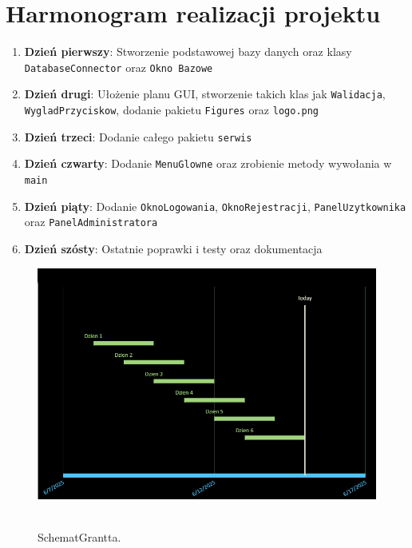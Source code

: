 \chapter{Harmonogram realizacji projektu}
\label{chap:Harmonogram realizacji projektu}

\begin{enumerate}
    \item \textbf{Dzień pierwszy}: Stworzenie podstawowej bazy danych oraz klasy \texttt{DatabaseConnector} oraz \texttt{Okno Bazowe}
    
    \item \textbf{Dzień drugi}: Ułożenie planu GUI, stworzenie takich klas jak \texttt{Walidacja}, \texttt{WygladPrzyciskow}, dodanie pakietu \texttt{Figures} oraz \texttt{logo.png}
    
    \item \textbf{Dzień trzeci}: Dodanie całego pakietu \texttt{serwis}
    
    \item \textbf{Dzień czwarty}: Dodanie \texttt{MenuGlowne} oraz zrobienie metody wywołania w \texttt{main}
    
    \item \textbf{Dzień piąty}: Dodanie \texttt{OknoLogowania}, \texttt{OknoRejestracji},  \texttt{PanelUzytkownika} oraz \texttt{PanelAdministratora}
    
    \item \textbf{Dzień szósty}: Ostatnie poprawki i testy oraz dokumentacja
\end{enumerate}

\begin{figure}[H]
    \centering
    \includegraphics[width=.9\linewidth]{figures/SchematGrantta.png}\
    \caption{SchematGrantta.\label{SchematGrantta}}
\end{figure}

